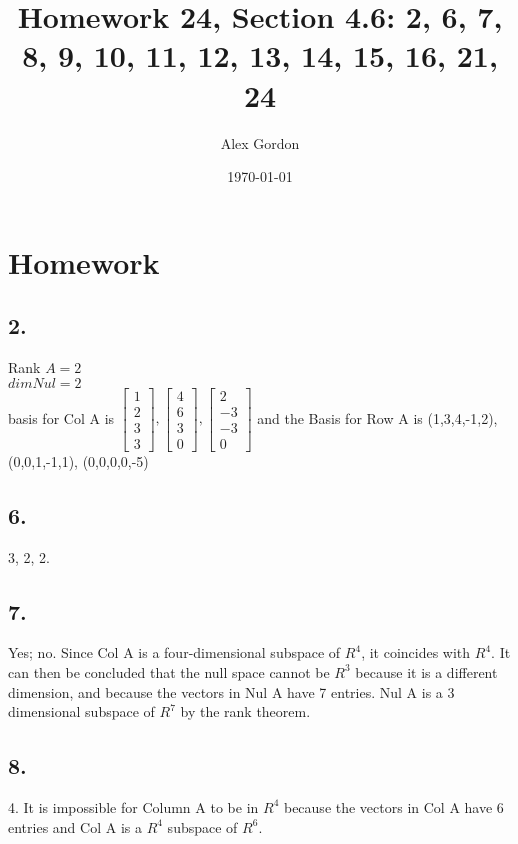 \documentclass[12]{scrartcl}
\begin{document}
\title{Homework 24, Section 4.6: 2, 6, 7, 8, 9, 10, 11, 12, 13, 14, 15, 16, 21, 24}
\author{Alex Gordon}
\date{\today}
\maketitle
\section*{Homework}
\subsection*{2.}
Rank $A = 2$ \\
$dim Nul = 2$ \\

basis for Col A is $\begin{bmatrix}  1 \\ 2 \\ 3 \\ 3  \end{bmatrix}, \begin{bmatrix}  4 \\ 6 \\ 3 \\ 0  \end{bmatrix}, \begin{bmatrix}  2 \\ -3 \\ -3 \\ 0  \end{bmatrix}$ and the Basis for Row A is (1,3,4,-1,2), (0,0,1,-1,1), (0,0,0,0,-5)


\subsection*{6.}
3, 2, 2. 
\subsection*{7.}
Yes; no. Since Col A is a four-dimensional subspace of $R^4$, it coincides with $R^4$. It can then be concluded that the null space cannot be $R^3$ because it is a different dimension, and because the vectors in Nul A have 7 entries. Nul A is a 3 dimensional subspace of $R^7$ by the rank theorem. 
\subsection*{8.}
4. It is impossible for Column A to be in $R^4$ because the vectors in Col A have 6 entries and Col A is a $R^4$ subspace of $R^6$. 
\end{document}
